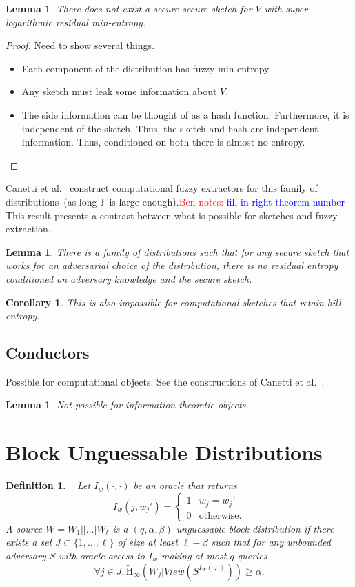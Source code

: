 \documentclass[11pt]{article}
\newcommand{\Hav}{\tilde{\mathrm{H}}_\infty}
\newtheorem{lemma}[theorem]{Lemma}
\newtheorem{corollary}[theorem]{Corollary}
\newtheorem{definition}[theorem]{Definition}
\newcommand{\authnote}[2]{{\textcolor{red}{\textsf{#1 notes: }\textcolor{blue}{ #2}}\marginpar{\textcolor{red}{\textbf{!!!!!}}}}}
\newcommand{\authnote}[2]{}
\newcommand{\bnote}[1]{{\authnote{Ben}{#1}}}
\begin{document}
\begin{lemma}
There does not exist a secure secure sketch for $V$ with super-logarithmic residual min-entropy.
\end{lemma}
\begin{proof}
Need to show several things.  
\begin{itemize}
\item Each component of the distribution has fuzzy min-entropy.
\item Any sketch must leak some information about $V$.
\item The side information can be thought of as a hash function.  Furthermore, it is independent of the sketch.  Thus, the sketch and hash are independent information.  Thus, conditioned on both there is almost no entropy.
\end{itemize}
\end{proof}


Canetti et al.~\cite[XXXX]{canetti2014key} construct computational fuzzy extractors for this family of distributions~(as long $\mathbb{F}$ is large enough).\bnote{fill in right theorem number}  This result presents a contrast between what is possible for sketches and fuzzy extraction.

\begin{lemma}
There is a family of distributions such that for any secure sketch that works for an adversarial choice of the distribution, there is no residual entropy conditioned on adversary knowledge and the secure sketch.
\end{lemma}

\begin{corollary}
This is also impossible for computational sketches that retain hill entropy.
\end{corollary}

\subsection{Conductors}
Possible for computational objects.  See the constructions of Canetti et al.~\cite{canetti2014key}.
\begin{lemma}
Not possible for information-theoretic objects.
\end{lemma}



\appendix
\section{Block Unguessable Distributions}
\begin{definition}~\cite[Definition 4.2]{canetti2014key}
\label{def:block guessable}
Let $I_w (\cdot, \cdot)$ be an oracle that returns \[I_w(j, w_j')=
\begin{cases}
1 & w_j = w_j'\\
0 & \text{otherwise}.
\end{cases}
\]
A source $W = W_1||...|W_\ell$ is a $(q, \alpha, \beta)$-\emph{unguessable block distribution} if there exists a set $J\subset\{1,..., \ell\}$ of size at least $\ell -\beta$ such that for any unbounded adversary $S$ with oracle access to $I_w$ making at most $q$ queries
\[
\forall j\in J, \Hav(W_j |View(S^{I_{W}(\cdot, \cdot)}))\geq \alpha.
\]
\end{definition}
\end{document}
